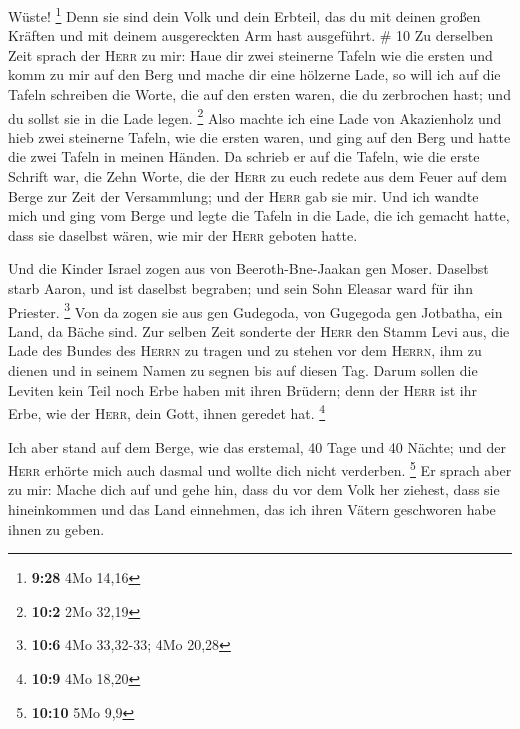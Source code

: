 Wüste! \footnote{\textbf{9:28} 4Mo 14,16}  Denn sie sind
dein Volk und dein Erbteil, das du mit deinen großen Kräften und mit
deinem ausgereckten Arm hast ausgeführt. \# 10  Zu
derselben Zeit sprach der \textsc{Herr} zu mir: Haue dir zwei steinerne
Tafeln wie die ersten und komm zu mir auf den Berg und mache dir eine
hölzerne Lade,  so will ich auf die Tafeln schreiben die
Worte, die auf den ersten waren, die du zerbrochen hast; und du sollst
sie in die Lade legen. \footnote{\textbf{10:2} 2Mo 32,19} 
Also machte ich eine Lade von Akazienholz und hieb zwei steinerne
Tafeln, wie die ersten waren, und ging auf den Berg und hatte die zwei
Tafeln in meinen Händen.  Da schrieb er auf die Tafeln,
wie die erste Schrift war, die Zehn Worte, die der \textsc{Herr} zu euch
redete aus dem Feuer auf dem Berge zur Zeit der Versammlung; und der
\textsc{Herr} gab sie mir.  Und ich wandte mich und ging
vom Berge und legte die Tafeln in die Lade, die ich gemacht hatte, dass
sie daselbst wären, wie mir der \textsc{Herr} geboten hatte.

 Und die Kinder Israel zogen aus von Beeroth-Bne-Jaakan
gen Moser. Daselbst starb Aaron, und ist daselbst begraben; und sein
Sohn Eleasar ward für ihn Priester. \footnote{\textbf{10:6} 4Mo
  33,32-33; 4Mo 20,28}  Von da zogen sie aus gen Gudegoda,
von Gugegoda gen Jotbatha, ein Land, da Bäche sind.  Zur
selben Zeit sonderte der \textsc{Herr} den Stamm Levi aus, die Lade des
Bundes des \textsc{Herrn} zu tragen und zu stehen vor dem
\textsc{Herrn}, ihm zu dienen und in seinem Namen zu segnen bis auf
diesen Tag.  Darum sollen die Leviten kein Teil noch Erbe
haben mit ihren Brüdern; denn der \textsc{Herr} ist ihr Erbe, wie der
\textsc{Herr}, dein Gott, ihnen geredet hat. \footnote{\textbf{10:9} 4Mo
  18,20}

 Ich aber stand auf dem Berge, wie das erstemal, 40 Tage
und 40 Nächte; und der \textsc{Herr} erhörte mich auch dasmal und wollte
dich nicht verderben. \footnote{\textbf{10:10} 5Mo 9,9} 
Er sprach aber zu mir: Mache dich auf und gehe hin, dass du vor dem Volk
her ziehest, dass sie hineinkommen und das Land einnehmen, das ich ihren
Vätern geschworen habe ihnen zu geben.

